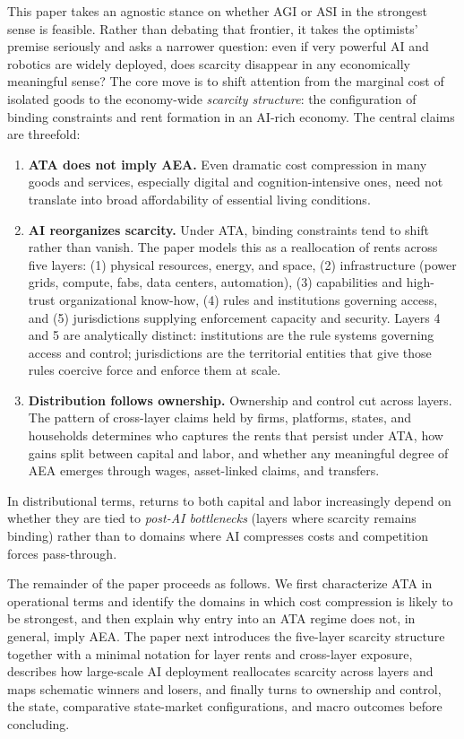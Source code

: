 \documentclass[11pt]{article}
\begin{document}
This paper takes an agnostic stance on whether AGI or ASI in the strongest sense is feasible. Rather than debating that frontier, it takes the optimists' premise seriously and asks a narrower question: even if very powerful AI and robotics are widely deployed, does scarcity disappear in any economically meaningful sense? The core move is to shift attention from the marginal cost of isolated goods to the economy-wide \emph{scarcity structure}: the configuration of binding constraints and rent formation in an AI-rich economy. The central claims are threefold:
\begin{enumerate}
 \item \textbf{ATA does not imply AEA.} Even dramatic cost compression in many goods and services, especially digital and cognition-intensive ones, need not translate into broad affordability of essential living conditions.
 \item \textbf{AI reorganizes scarcity.} Under ATA, binding constraints tend to shift rather than vanish. The paper models this as a reallocation of rents across five layers: (1) physical resources, energy, and space, (2) infrastructure (power grids, compute, fabs, data centers, automation), (3) capabilities and high-trust organizational know-how, (4) rules and institutions governing access, and (5) jurisdictions supplying enforcement capacity and security. Layers 4 and 5 are analytically distinct: institutions are the rule systems governing access and control; jurisdictions are the territorial entities that give those rules coercive force and enforce them at scale.
 \item \textbf{Distribution follows ownership.} Ownership and control cut across layers. The pattern of cross-layer claims held by firms, platforms, states, and households determines who captures the rents that persist under ATA, how gains split between capital and labor, and whether any meaningful degree of AEA emerges through wages, asset-linked claims, and transfers.
\end{enumerate}
In distributional terms, returns to both capital and labor increasingly depend on whether they are tied to \emph{post-AI bottlenecks} (layers where scarcity remains binding) rather than to domains where AI compresses costs and competition forces pass-through.

The remainder of the paper proceeds as follows. We first characterize ATA in operational terms and identify the domains in which cost compression is likely to be strongest, and then explain why entry into an ATA regime does not, in general, imply AEA. The paper next introduces the five-layer scarcity structure together with a minimal notation for layer rents and cross-layer exposure, describes how large-scale AI deployment reallocates scarcity across layers and maps schematic winners and losers, and finally turns to ownership and control, the state, comparative state-market configurations, and macro outcomes before concluding.
\end{document}
